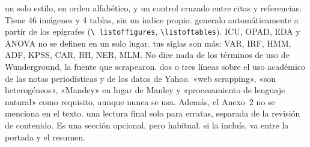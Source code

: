 \documentclass[12pt,a4paper,oneside]{report}
\newcommand{\cod}[1]{\texttt{\small #1}}
\begin{document}
\begin{enumerate}[label=\textbf{\arabic*.},leftmargin=*,itemsep=8pt]
    {un solo estilo, en orden alfabético, y un control cruzado entre citas y
    referencias.}
    {Tiene 46 imágenes y 4 tablas, sin un índice propio.}
    {generalo automáticamente a partir de los epígrafes (\cod{\textbackslash
    listoffigures}, \cod{\textbackslash listoftables}).}
    {ICU, OPAD, EDA y ANOVA no se definen en un solo lugar.}
    {tus siglas son más: VAR, IRF, HMM, ADF, KPSS, CAR, BH, NER, MLM.}
    {No dice nada de los términos de uso de Wunderground, la fuente que scrapearon.}
    {dos o tres líneas sobre el uso académico de las notas periodísticas y de los datos
    de Yahoo.}
    {«web scrapping», «son heterogéneos», «Mandey» en lugar de Manley y «procesamiento
    de lenguaje natural» como requisito, aunque nunca se usa. Además, el Anexo~2 no se
    menciona en el texto.}
    {una lectura final solo para erratas, separada de la revisión de contenido.}
    {Es una sección opcional, pero habitual.}
    {si la incluís, va entre la portada y el resumen.}
\end{enumerate}
\end{document}
